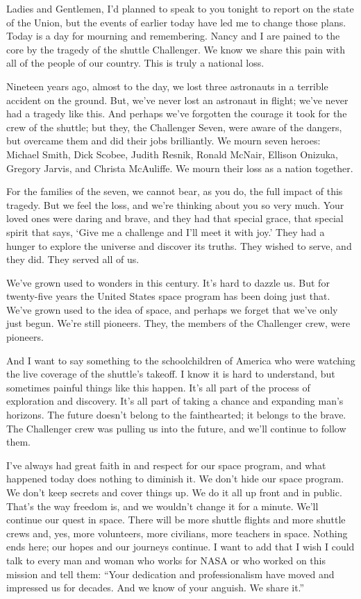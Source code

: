 \documentclass[a4paper]{amsbook}
\begin{document}
\vspace{10 mm}

Ladies and Gentlemen, I'd planned to speak to you tonight to report on the state of the Union, but the events of earlier today have led me to change those plans. Today is a day for mourning and remembering. Nancy and I are pained to the core by the tragedy of the shuttle Challenger. We know we share this pain with all of the people of our country. This is truly a national loss.

Nineteen years ago, almost to the day, we lost three astronauts in a terrible accident on the ground. But, we've never lost an astronaut in flight; we've never had a tragedy like this. And perhaps we've forgotten the courage it took for the crew of the shuttle; but they, the Challenger Seven, were aware of the dangers, but overcame them and did their jobs brilliantly. We mourn seven heroes: Michael Smith, Dick Scobee, Judith Resnik, Ronald McNair, Ellison Onizuka, Gregory Jarvis, and Christa McAuliffe. We mourn their loss as a nation together.

For the families of the seven, we cannot bear, as you do, the full impact of this tragedy. But we feel the loss, and we're thinking about you so very much. Your loved ones were daring and brave, and they had that special grace, that special spirit that says, ‘Give me a challenge and I'll meet it with joy.' They had a hunger to explore the universe and discover its truths. They wished to serve, and they did. They served all of us.

We've grown used to wonders in this century. It's hard to dazzle us. But for twenty-five years the United States space program has been doing just that. We've grown used to the idea of space, and perhaps we forget that we've only just begun. We're still pioneers. They, the members of the Challenger crew, were pioneers.

And I want to say something to the schoolchildren of America who were watching the live coverage of the shuttle's takeoff. I know it is hard to understand, but sometimes painful things like this happen. It's all part of the process of exploration and discovery. It's all part of taking a chance and expanding man's horizons. The future doesn't belong to the fainthearted; it belongs to the brave. The Challenger crew was pulling us into the future, and we'll continue to follow them.

I've always had great faith in and respect for our space program, and what happened today does nothing to diminish it. We don't hide our space program. We don't keep secrets and cover things up. We do it all up front and in public. That's the way freedom is, and we wouldn't change it for a minute. We'll continue our quest in space. There will be more shuttle flights and more shuttle crews and, yes, more volunteers, more civilians, more teachers in space. Nothing ends here; our hopes and our journeys continue. I want to add that I wish I could talk to every man and woman who works for NASA or who worked on this mission and tell them: “Your dedication and professionalism have moved and impressed us for decades. And we know of your anguish. We share it.”
\end{document}
